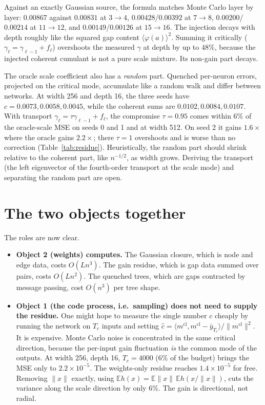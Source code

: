 \documentclass[11pt]{article}
\theoremstyle{definition}
\theoremstyle{remark}
\newcommand{\E}{\mathbb E}
\begin{document}
\noindent Against an exactly Gaussian source, the formula matches Monte Carlo layer by layer: $0.00867$ against $0.00831$ at $3\to4$, $0.00428$/$0.00392$ at $7\to8$, $0.00200$/$0.00214$ at $11\to12$, and $0.00149$/$0.00126$ at $15\to16$. The injection decays with depth roughly like the squared gap content $\langle\varphi(a)\rangle^2$. Summing it critically ($\gamma_\ell=\gamma_{\ell-1}+f_\ell$) overshoots the measured $\gamma$ at depth by up to $48\%$, because the injected coherent cumulant is not a pure scale mixture. Its non-gain part decays.

The oracle scale coefficient also has a \emph{random} part. Quenched per-neuron errors, projected on the critical mode, accumulate like a random walk and differ between networks. At width 256 and depth 16, the three seeds have $c=0.0073,0.0058,0.0045$, while the coherent sums are $0.0102,0.0084,0.0107$. With transport $\gamma_\ell=\tau\gamma_{\ell-1}+f_\ell$, the compromise $\tau=0.95$ comes within $6\%$ of the oracle-scale MSE on seeds 0 and 1 and at width 512. On seed 2 it gains $1.6\times$ where the oracle gains $2.2\times$; there $\tau=1$ overshoots and is worse than no correction (Table~\ref{tab:residue}). Heuristically, the random part should shrink relative to the coherent part, like $n^{-1/2}$, as width grows. Deriving the transport (the left eigenvector of the fourth-order transport at the scale mode) and separating the random part are open.

\section{The two objects together}\label{sec:together}

The roles are now clear.
\begin{itemize}
\item \textbf{Object 2 (weights) computes.} The Gaussian closure, which is node and edge data, costs $O(Ln^3)$. The gain residue, which is gap data summed over pairs, costs $O(Ln^2)$. The quenched trees, which are gaps contracted by message passing, cost $O(n^3)$ per tree shape.
\item \textbf{Object 1 (the code process, i.e.\ sampling) does not need to supply the residue.} One might hope to measure the single number $c$ cheaply by running the network on $T_c$ inputs and setting $\hat c=\langle m^{\mathrm{cl}},m^{\mathrm{cl}}-\bar y_{T_c}\rangle/\|m^{\mathrm{cl}}\|^2$. It is expensive. Monte Carlo noise is concentrated in the same critical direction, because the per-input gain fluctuation \emph{is} the common mode of the outputs. At width 256, depth 16, $T_c=4000$ ($6\%$ of the budget) brings the MSE only to $2.2\times10^{-5}$. The weights-only residue reaches $1.4\times10^{-5}$ for free. Removing $\|x\|$ exactly, using $\E h(x)=\E\|x\|\,\E h(x/\|x\|)$, cuts the variance along the scale direction by only $6\%$. The gain is directional, not radial.
\end{itemize}
\end{document}
